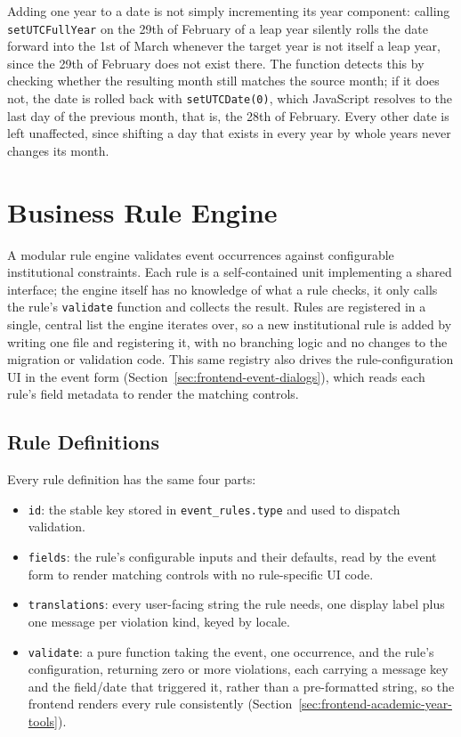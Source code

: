 Adding one year to a date is not simply incrementing its year component: calling \texttt{setUTCFullYear} on the 29th of February of a leap year silently rolls the date forward into the 1st of March whenever the target year is not itself a leap year, since the 29th of February does not exist there. The function detects this by checking whether the resulting month still matches the source month; if it does not, the date is rolled back with \texttt{setUTCDate(0)}, which JavaScript resolves to the last day of the previous month, that is, the 28th of February. Every other date is left unaffected, since shifting a day that exists in every year by whole years never changes its month.

\section{Business Rule Engine} \label{sec:rule-engine}

A modular rule engine validates event occurrences against configurable institutional constraints. Each rule is a self-contained unit implementing a shared interface; the engine itself has no knowledge of what a rule checks, it only calls the rule's \texttt{validate} function and collects the result. Rules are registered in a single, central list the engine iterates over, so a new institutional rule is added by writing one file and registering it, with no branching logic and no changes to the migration or validation code. This same registry also drives the rule-configuration UI in the event form (Section~\ref{sec:frontend-event-dialogs}), which reads each rule's field metadata to render the matching controls.

\subsection{Rule Definitions} \label{sec:rule-definitions}

Every rule definition has the same four parts:

\begin{itemize}
    \item \texttt{id}: the stable key stored in \texttt{event\_rules.type} and used to dispatch validation.
    \item \texttt{fields}: the rule's configurable inputs and their defaults, read by the event form to render matching controls with no rule-specific UI code.
    \item \texttt{translations}: every user-facing string the rule needs, one display label plus one message per violation kind, keyed by locale.
    \item \texttt{validate}: a pure function taking the event, one occurrence, and the rule's configuration, returning zero or more violations, each carrying a message key and the field/date that triggered it, rather than a pre-formatted string, so the frontend renders every rule consistently (Section~\ref{sec:frontend-academic-year-tools}).
\end{itemize}

